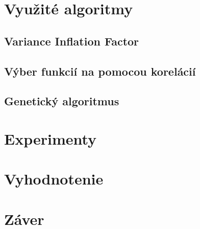 \documentclass[runningheads]{llncs}
\begin{document}
\section{Využité algoritmy}
\subsection{Variance Inflation Factor}
\subsection{Výber funkcií na pomocou korelácií}
\subsection{Genetický algoritmus}

\section{Experimenty}

\section{Vyhodnotenie}

\section{Záver}
\end{document}
